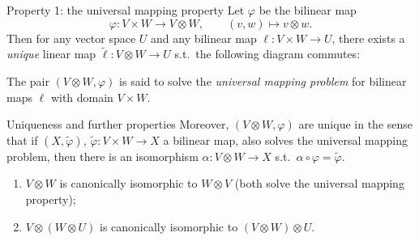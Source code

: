 \documentclass[10pt]{beamer}
\begin{document}
\begin{frame}[fragile]{Property 1: the universal mapping property}
	Let $\varphi$ be the bilinear map
	\[
		\varphi : V \times W \longrightarrow V \otimes W,
		\qquad (v, w) \longmapsto v \otimes w .
	\]
	Then for any vector space $U$ and any bilinear map
	$\ell : V \times W \to U$, there exists a \emph{unique} linear map
	$\widetilde{\ell} : V \otimes W \to U$ s.t.\ the following diagram
	commutes:
	\begin{center}
	\end{center}
	The pair $(V \otimes W, \varphi)$ is said to solve the
	\emph{universal mapping problem} for bilinear maps $\ell$ with
	domain $V \times W$.
\end{frame}

\begin{frame}{Uniqueness and further properties}
	Moreover, $(V \otimes W, \varphi)$ are unique in the sense that if
	$(X, \widetilde{\varphi})$,
	$\widetilde{\varphi} : V \times W \to X$ a bilinear map, also
	solves the universal mapping problem, then there is an isomorphism
	$\alpha : V \otimes W \to X$ s.t.\
	$\alpha \circ \varphi = \widetilde{\varphi}$.
	\medskip
	\begin{enumerate}
		\item[(b)] $V \otimes W$ is canonically isomorphic to
		      $W \otimes V$ (both solve the universal mapping
		      property);
		\item[(c)] $V \otimes (W \otimes U)$ is canonically isomorphic
		      to $(V \otimes W) \otimes U$.
	\end{enumerate}
\end{frame}
\end{document}
